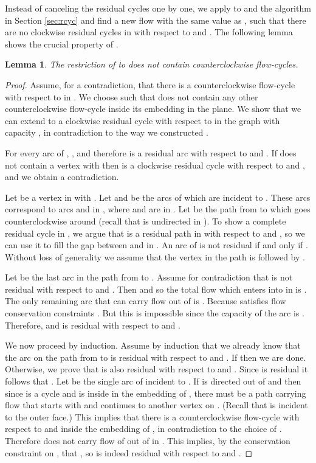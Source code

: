 \documentclass[a4paper,11pt]{article}
\newtheorem{lemma}[theorem]{Lemma}
\begin{document}
Instead of canceling the residual cycles one by one,
we apply to  and  the algorithm in Section \ref{sec:rcyc} and find a
new flow  with the same value as , such that there are no clockwise
residual cycles in  with respect to  and .
The following lemma shows the crucial property of .

\begin{lemma}
The restriction
 of  to  does not contain counterclockwise flow-cycles.
\end{lemma}
\begin{proof}
  Assume, for a contradiction, that there is a counterclockwise flow-cycle 
  with respect to  in . We choose  such that  does
  not contain any other counterclockwise flow-cycle inside its embedding in
  the plane. We show that we can extend  to a clockwise residual cycle
  with respect to  in the graph  with capacity ,
in contradiction to the way we constructed .

For every arc  of , , and therefore  is a residual arc
with respect to  and . If  does not contain a vertex  with
 then  is a clockwise residual cycle with respect to
 and , and we obtain a contradiction.

Let  be a vertex in  with . Let  and  be the arcs of  which are incident to .
These arcs correspond to arcs  and  in ,
where  and  are in .
Let  be the path from  to  which goes counterclockwise around
 (recall that  is undirected in ).
To show a complete residual cycle in , we argue that  is a residual path
in  with respect to  and , so we can use it to fill the gap between
 and  in .
An arc  of  is not residual if
and only if .
Without loss of generality we
assume that the vertex  in the path  is followed by .

Let  be the last arc in the path  from  to
.
Assume for contradiction that  is not residual with respect to 
and . Then  and so the total flow which enters into
 in  is . The only remaining arc that can carry flow
out of  is . Because  satisfies flow
conservation constraints .
But this is impossible since the capacity of the arc  is
. Therefore,  and  is residual
with respect to  and .

We now proceed by induction. Assume by induction that we already
know that the arc  on the path 
from  to  is residual with respect to  and .
If  then we are done. Otherwise, we
prove that  is also
residual with respect to  and . Since   is
residual it follows that
  .
Let  be the single arc of  incident to . If  is
directed out of  and  then since  is a cycle and
 is inside  in the embedding of , there must be a path
carrying flow that starts with  and continues to another vertex
on . (Recall that  is incident to the outer face.) This
implies that there is a counterclockwise flow-cycle with respect to
 and  inside the embedding of , in contradiction to
the choice of . Therefore  does not carry flow of  out of
 in . This implies, by the conservation constraint on ,
that ,
 so  is indeed residual
with respect to  and .


\end{proof}
\end{document}
